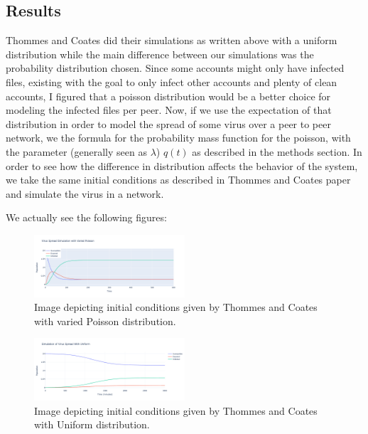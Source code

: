 \documentclass[12pt, oneside]{article}
\begin{document}
    \subsection{Results}
    Thommes and Coates did their simulations as written above with a uniform distribution while the main difference between our simulations was the probability distribution chosen.
    Since some accounts might only have infected files, existing with the goal to only infect other accounts and plenty of clean accounts, I figured that a poisson distribution
    would be a better choice for modeling the infected files per peer. Now, if we use the expectation of that distribution in order to model the spread of some 
    virus over a peer to peer network, we the formula for the probability mass function for the poisson, with the parameter (generally seen as $\lambda$) $q(t)$ as described in the 
    methods section. In order to see how the difference in distribution affects the behavior of the system, we take the same initial conditions as described in Thommes and Coates paper
    and simulate the virus in a network.\newline

    We actually see the following figures:
    \begin{figure}[htbp]
        \centering
        \includegraphics[width=0.5\textwidth]{2MPoisson.png}
        \caption{Image depicting initial conditions given by Thommes and Coates with varied Poisson distribution.}
    \end{figure}

    \begin{figure}[htbp]
        \centering
        \includegraphics[width=0.5\textwidth]{2MUniform.png}
        \caption{Image depicting initial conditions given by Thommes and Coates with Uniform distribution.}
    \end{figure}






\end{document}
